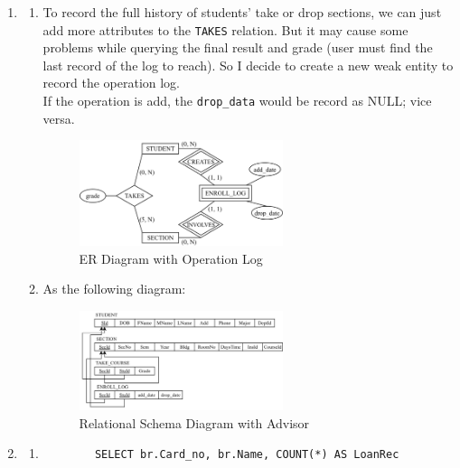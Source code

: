 \documentclass[12pt,a4paper]{article}
\begin{document}
\begin{enumerate}
\begin{enumerate}
    \end{enumerate}
    \item \begin{enumerate}
        \item To record the full history of students' take or drop sections, we can just add more attributes to the \texttt{TAKES} relation. But it may cause some problems while querying the final result and grade (user must find the last record of the log to reach). So I decide to create a new weak entity to record the operation log.\\
        If the operation is add, the \texttt{drop\_data} would be record as NULL; vice versa.\\
        \begin{figure}[H]
            \centering
            \includegraphics[width=0.6\textwidth]{src/2A.png}
            \caption{ER Diagram with Operation Log}
            \label{fig:ER_diagram_with_log}
        \end{figure}
        \item As the following diagram:
        \begin{figure}[H]
            \centering
            \includegraphics[width=0.6\textwidth]{src/2B.png}
            \caption{Relational Schema Diagram with Advisor}
            \label{fig:ER_diagram_with_advisor}
        \end{figure}
    \end{enumerate}
    \item 
    \begin{enumerate}
        \item
        \begin{verbatim}
        SELECT br.Card_no, br.Name, COUNT(*) AS LoanRec

\end{verbatim}
\end{enumerate}
\end{enumerate}
\end{document}
